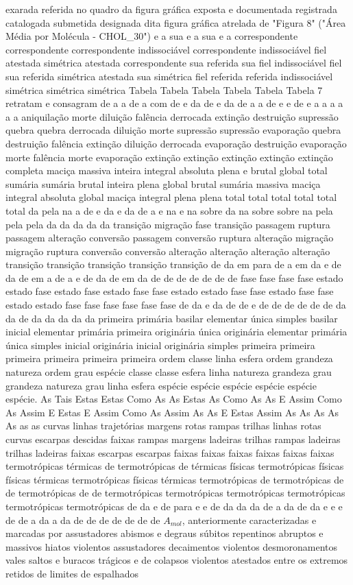 exarada referida no quadro da figura gráfica exposta e documentada registrada catalogada submetida designada dita figura gráfica atrelada de "Figura 8" ("Área Média por Molécula - CHOL\_30") e a sua e a sua e a correspondente correspondente correspondente indissociável correspondente indissociável fiel atestada simétrica atestada correspondente sua referida sua fiel indissociável fiel sua referida simétrica atestada sua simétrica fiel referida referida indissociável simétrica simétrica simétrica Tabela Tabela Tabela Tabela Tabela Tabela 7 retratam e consagram de a a de a com de e da de e da de a a de e e de e a a a a a a aniquilação morte diluição falência derrocada extinção destruição supressão quebra quebra derrocada diluição morte supressão supressão evaporação quebra destruição falência extinção diluição derrocada evaporação destruição evaporação morte falência morte evaporação extinção extinção extinção extinção extinção completa maciça massiva inteira integral absoluta plena e brutal global total sumária sumária brutal inteira plena global brutal sumária massiva maciça integral absoluta global maciça integral plena plena total total total total total total da pela na a de e da e da de a e na e na sobre da na sobre sobre na pela pela pela da da da da da transição migração fase transição passagem ruptura passagem alteração conversão passagem conversão ruptura alteração migração migração ruptura conversão conversão alteração alteração alteração alteração transição transição transição transição transição de da em para de a em da e de da de em a de a e de da de em da de de de de de de de fase fase fase fase estado estado fase estado fase estado fase fase estado estado fase fase estado fase fase estado estado fase fase fase fase fase fase de da e da de de e de de de de de de da da de da da da da da primeira primária basilar elementar única simples basilar inicial elementar primária primeira originária única originária elementar primária única simples inicial originária inicial originária simples primeira primeira primeira primeira primeira primeira ordem classe linha esfera ordem grandeza natureza ordem grau espécie classe classe esfera linha natureza grandeza grau grandeza natureza grau linha esfera espécie espécie espécie espécie espécie espécie. As Tais Estas Estas Como As As Estas As Como As As E Assim Como As Assim E Estas E Assim Como As Assim As As E Estas Assim As As As As As as as curvas linhas trajetórias margens rotas rampas trilhas linhas rotas curvas escarpas descidas faixas rampas margens ladeiras trilhas rampas ladeiras trilhas ladeiras faixas escarpas escarpas faixas faixas faixas faixas faixas faixas termotrópicas térmicas de termotrópicas de térmicas físicas termotrópicas físicas físicas térmicas termotrópicas físicas térmicas termotrópicas de termotrópicas de de termotrópicas de de termotrópicas termotrópicas termotrópicas termotrópicas termotrópicas termotrópicas de da e de para e e de da da da de a da de da e e e de de a da a da de de de de de de de $A_{mol}$, anteriormente caracterizadas e marcadas por assustadores abismos e degraus súbitos repentinos abruptos e massivos hiatos violentos assustadores decaimentos violentos desmoronamentos vales saltos e buracos trágicos e de colapsos violentos atestados entre os extremos retidos de limites de espalhados 
